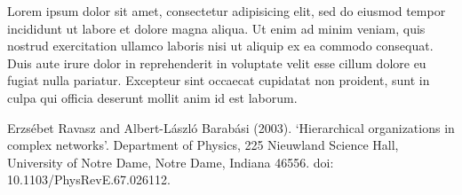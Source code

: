 \documentclass{llncs}
\begin{document}
Lorem ipsum dolor sit amet, consectetur adipisicing elit, sed do eiusmod tempor incididunt ut labore et dolore magna aliqua. Ut enim ad minim veniam, quis nostrud exercitation ullamco laboris nisi ut aliquip ex ea commodo consequat. Duis aute irure dolor in reprehenderit in voluptate velit esse cillum dolore eu fugiat nulla pariatur. Excepteur sint occaecat cupidatat non proident, sunt in culpa qui officia deserunt mollit anim id est laborum.

%
%
\begin{thebibliography}{3}
%
%
%
%
%

Erzsébet Ravasz and Albert-László Barabási (2003).
`Hierarchical organizations in complex networks'.
Department of Physics, 225 Nieuwland Science Hall,
University of Notre Dame, Notre Dame, Indiana 46556.
doi: 10.1103/PhysRevE.67.026112.

\end{thebibliography}
\end{document}
